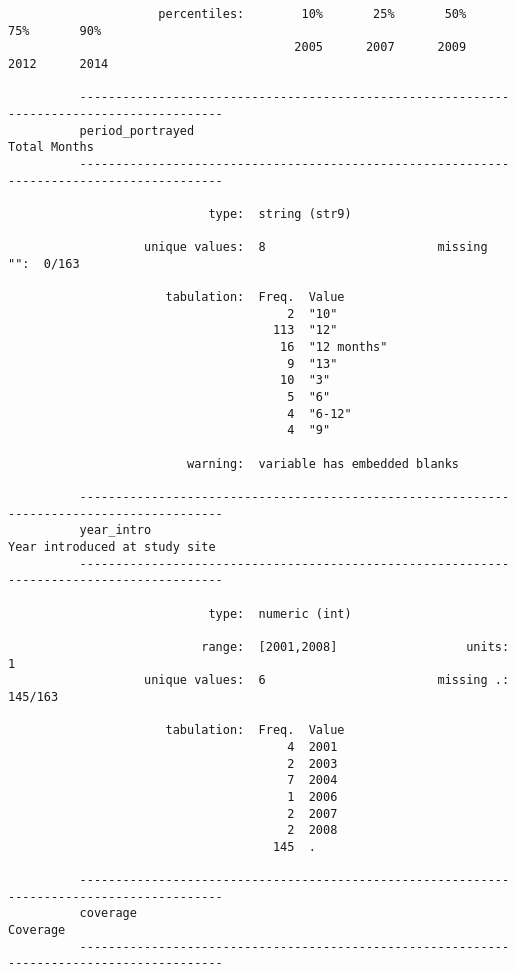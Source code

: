 \documentclass{article}
\begin{document}
\begin{verbatim}
                     percentiles:        10%       25%       50%       75%       90%
                                        2005      2007      2009      2012      2014
          
          ------------------------------------------------------------------------------------------
          period_portrayed                                                              Total Months
          ------------------------------------------------------------------------------------------
          
                            type:  string (str9)
          
                   unique values:  8                        missing "":  0/163
          
                      tabulation:  Freq.  Value
                                       2  "10"
                                     113  "12"
                                      16  "12 months"
                                       9  "13"
                                      10  "3"
                                       5  "6"
                                       4  "6-12"
                                       4  "9"
          
                         warning:  variable has embedded blanks
          
          ------------------------------------------------------------------------------------------
          year_intro                                                   Year introduced at study site
          ------------------------------------------------------------------------------------------
          
                            type:  numeric (int)
          
                           range:  [2001,2008]                  units:  1
                   unique values:  6                        missing .:  145/163
          
                      tabulation:  Freq.  Value
                                       4  2001
                                       2  2003
                                       7  2004
                                       1  2006
                                       2  2007
                                       2  2008
                                     145  .
          
          ------------------------------------------------------------------------------------------
          coverage                                                                          Coverage
          ------------------------------------------------------------------------------------------
          

\end{verbatim}
\end{document}
